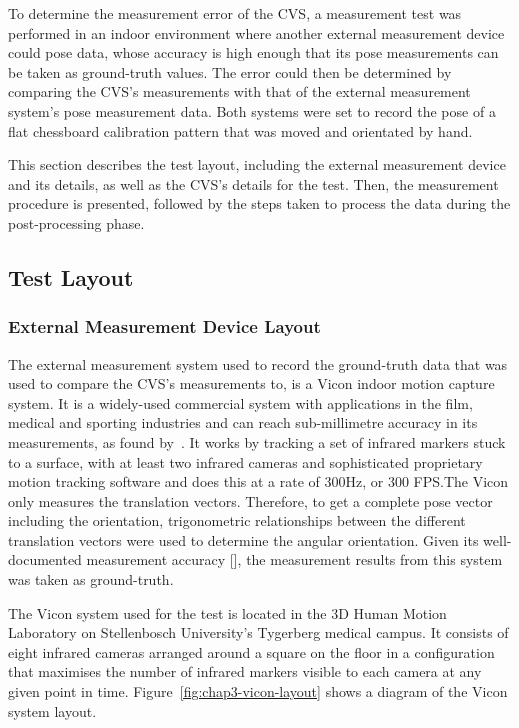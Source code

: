 To determine the measurement error of the CVS, a measurement test was performed in an indoor environment where another external measurement device could pose data, whose accuracy is high enough that its pose measurements can be taken as ground-truth values. The error could then be determined by comparing the CVS's measurements with that of the external measurement system's pose measurement data. Both systems were set to record the pose of a flat chessboard calibration pattern that was moved and orientated by hand.

This section describes the test layout, including the external measurement device and its details, as well as the CVS's details for the test. Then, the measurement procedure is presented, followed by the steps taken to process the data during the post-processing phase. 

\subsection{Test Layout}
\label{sec:vicon-test-setup}

\subsubsection{External Measurement Device Layout}

The external measurement system used to record the ground-truth data that was used to compare the CVS's measurements to, is a Vicon indoor motion capture system. It is a widely-used commercial system with applications in the film, medical and sporting industries and can reach sub-millimetre accuracy in its measurements, as found by~\cite{windolf2008systematic}. It works by tracking a set of infrared markers stuck to a surface, with at least two infrared cameras and sophisticated proprietary motion tracking software and does this at a rate of 300Hz, or 300 FPS.\@ The Vicon only measures the translation vectors. Therefore, to get a complete pose vector including the orientation, trigonometric relationships between the different translation vectors were used to determine the angular orientation. Given its well-documented measurement accuracy [\citeauthor{windolf2008systematic}], the measurement results from this system was taken as ground-truth.

The Vicon system used for the test is located in the 3D Human Motion Laboratory on Stellenbosch University's Tygerberg medical campus. It consists of eight infrared cameras arranged around a square on the floor in a configuration that maximises the number of infrared markers visible to each camera at any given point in time. Figure~\ref{fig:chap3-vicon-layout} shows a diagram of the Vicon system layout. 
 
